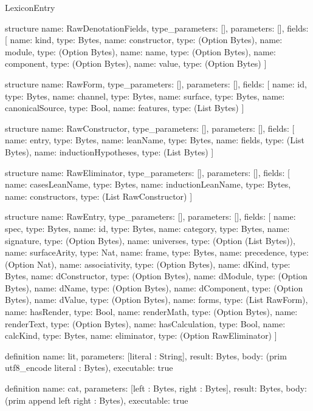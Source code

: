 \begin{lexlean}{LexiconEntry}
\begin{semanticmodule}
structure{
  name: RawDenotationFields,
  type_parameters: [],
  parameters: [],
  fields: [
    {name: kind, type: Bytes},
    {name: constructor, type: (Option Bytes)},
    {name: module, type: (Option Bytes)},
    {name: name, type: (Option Bytes)},
    {name: component, type: (Option Bytes)},
    {name: value, type: (Option Bytes)}
  ]
}

structure{
  name: RawForm,
  type_parameters: [],
  parameters: [],
  fields: [
    {name: id, type: Bytes},
    {name: channel, type: Bytes},
    {name: surface, type: Bytes},
    {name: canonicalSource, type: Bool},
    {name: features, type: (List Bytes)}
  ]
}

structure{
  name: RawConstructor,
  type_parameters: [],
  parameters: [],
  fields: [
    {name: entry, type: Bytes},
    {name: leanName, type: Bytes},
    {name: fields, type: (List Bytes)},
    {name: inductionHypotheses, type: (List Bytes)}
  ]
}

structure{
  name: RawEliminator,
  type_parameters: [],
  parameters: [],
  fields: [
    {name: casesLeanName, type: Bytes},
    {name: inductionLeanName, type: Bytes},
    {name: constructors, type: (List RawConstructor)}
  ]
}

structure{
  name: RawEntry,
  type_parameters: [],
  parameters: [],
  fields: [
    {name: spec, type: Bytes},
    {name: id, type: Bytes},
    {name: category, type: Bytes},
    {name: signature, type: (Option Bytes)},
    {name: universes, type: (Option (List Bytes))},
    {name: surfaceArity, type: Nat},
    {name: frame, type: Bytes},
    {name: precedence, type: (Option Nat)},
    {name: associativity, type: (Option Bytes)},
    {name: dKind, type: Bytes},
    {name: dConstructor, type: (Option Bytes)},
    {name: dModule, type: (Option Bytes)},
    {name: dName, type: (Option Bytes)},
    {name: dComponent, type: (Option Bytes)},
    {name: dValue, type: (Option Bytes)},
    {name: forms, type: (List RawForm)},
    {name: hasRender, type: Bool},
    {name: renderMath, type: (Option Bytes)},
    {name: renderText, type: (Option Bytes)},
    {name: hasCalculation, type: Bool},
    {name: calcKind, type: Bytes},
    {name: eliminator, type: (Option RawEliminator)}
  ]
}

definition{
  name: lit,
  parameters: [literal : String],
  result: Bytes,
  body: (prim utf8_encode literal : Bytes),
  executable: true
}

definition{
  name: cat,
  parameters: [left : Bytes, right : Bytes],
  result: Bytes,
  body: (prim append left right : Bytes),
  executable: true
}


\end{semanticmodule}
\end{lexlean}
